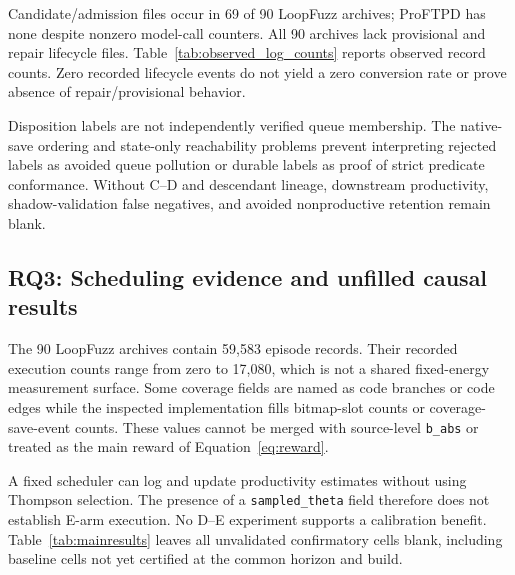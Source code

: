 \documentclass[final,5p,times,number]{elsarticle}
\begin{document}
Candidate/admission files occur in 69 of 90 LoopFuzz archives; ProFTPD has none despite nonzero model-call counters. All 90 archives lack provisional and repair lifecycle files. Table~\ref{tab:observed_log_counts} reports observed record counts. Zero recorded lifecycle events do not yield a zero conversion rate or prove absence of repair/provisional behavior.

Disposition labels are not independently verified queue membership. The native-save ordering and state-only reachability problems prevent interpreting rejected labels as avoided queue pollution or durable labels as proof of strict predicate conformance. Without C--D and descendant lineage, downstream productivity, shadow-validation false negatives, and avoided nonproductive retention remain blank.

\subsection{RQ3: Scheduling evidence and unfilled causal results}
The 90 LoopFuzz archives contain 59,583 episode records. Their recorded execution counts range from zero to 17,080, which is not a shared fixed-energy measurement surface. Some coverage fields are named as code branches or code edges while the inspected implementation fills bitmap-slot counts or coverage-save-event counts. These values cannot be merged with source-level \texttt{b\_abs} or treated as the main reward of Equation~\ref{eq:reward}.

A fixed scheduler can log and update productivity estimates without using Thompson selection. The presence of a \texttt{sampled\_theta} field therefore does not establish E-arm execution. No D--E experiment supports a calibration benefit. Table~\ref{tab:mainresults} leaves all unvalidated confirmatory cells blank, including baseline cells not yet certified at the common horizon and build.
\end{document}
